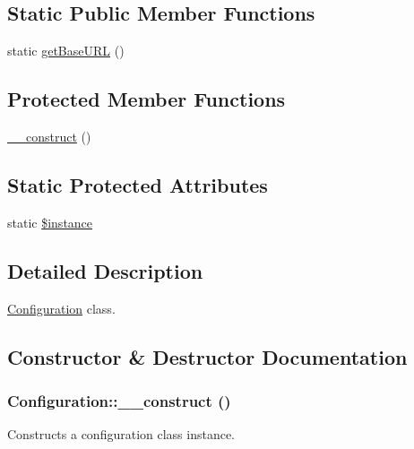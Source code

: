 \subsection*{Static Public Member Functions}
\begin{DoxyCompactItemize}
\item 
static \hyperlink{classConfiguration_a9a1a49e746b5409d674183da01362444}{getBaseURL} ()
\end{DoxyCompactItemize}
\subsection*{Protected Member Functions}
\begin{DoxyCompactItemize}
\item 
\hyperlink{classConfiguration_a3102d300a65b42bea6794dacd9d7afc9}{\_\-\_\-construct} ()
\end{DoxyCompactItemize}
\subsection*{Static Protected Attributes}
\begin{DoxyCompactItemize}
\item 
static \hyperlink{classConfiguration_a1f4b6d097ad7230a63eba874ddbc7bef}{\$instance}
\end{DoxyCompactItemize}


\subsection{Detailed Description}
\hyperlink{classConfiguration}{Configuration} class. 

\subsection{Constructor \& Destructor Documentation}
\hypertarget{classConfiguration_a3102d300a65b42bea6794dacd9d7afc9}{
\subsubsection[{\_\-\_\-construct}]{\setlength{\rightskip}{0pt plus 5cm}Configuration::\_\-\_\-construct ()}}
\label{classConfiguration_a3102d300a65b42bea6794dacd9d7afc9}
Constructs a configuration class instance. 

